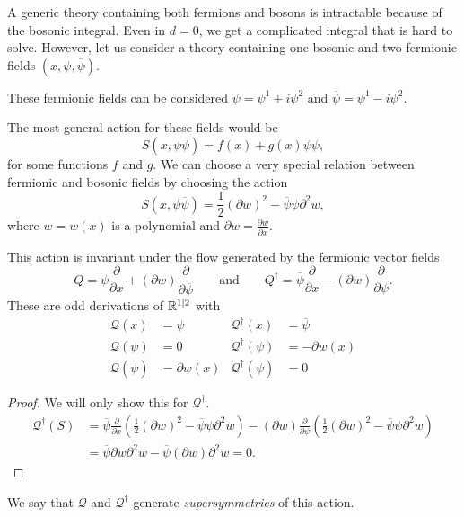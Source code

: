 A generic theory containing both fermions and bosons is intractable because of the bosonic integral. Even in $d = 0$, we get a complicated integral that is hard to solve.
However, let us consider a theory containing one bosonic and two fermionic fields $(x, \psi, \overline{\psi})$.
\begin{leftbar}
  These fermionic fields can be considered $\psi = \psi^1 + i \psi^2$ and $\overline{\psi} = \psi^1 - i \psi^2$.
\end{leftbar}
The most general action for these fields would be
\begin{equation}
  S(x, \psi \overline{\psi}) = f(x) + g(x) \overline{\psi} \psi,
\end{equation}
for some functions $f$ and $g$.
We can choose a very special relation between fermionic and bosonic fields by choosing the action
\begin{equation}
  S(x, \psi \overline{\psi}) = \frac{1}{2}(\partial w)^2 - \overline{\psi} \psi \partial^2 w,
\end{equation}
where $w = w(x)$ is a polynomial and $\partial w = \frac{\partial w}{\partial x}$.
\begin{claim}
  This action is invariant under the flow generated by the fermionic vector fields
  \begin{equation}
    Q = \psi \frac{\partial }{\partial x} + (\partial w) \frac{\partial }{\partial \overline{\psi}} \qquad \text{and} \qquad Q^{\dagger} = \overline{\psi} \frac{\partial }{\partial x} - (\partial w) \frac{\partial }{\partial \psi}.
  \end{equation}
  These are odd derivations of $\mathbb{R}^{1 \suchthat 2}$ with 
  \begin{align}
    \mathcal{Q}(x) &= \psi & \mathcal{Q}^{\dagger}(x) &= \overline{\psi} \\
    \mathcal{Q}(\psi) &= 0 &  \mathcal{Q}^{\dagger}(\psi) &= -\partial w (x) \\
    \mathcal{Q}(\overline{\psi}) &= \partial w (x) & \mathcal{Q}^{\dagger}(\overline{\psi}) &= 0
  \end{align}
\end{claim}
\begin{proof}
  We will only show this for $\mathcal{Q}^{\dagger}$.
  \begin{align}
    \mathcal{Q}^{\dagger}(S) &= \overline{\psi} \frac{\partial }{\partial x} \left( \frac{1}{2} (\partial w)^2 - \overline{\psi} \psi \partial^2 w \right) - (\partial w) \frac{\partial }{\partial \psi} \left( \frac{1}{2} (\partial w)^2 - \overline{\psi} \psi \partial^2 w \right) \\
			     &= \overline{\psi} \partial w \partial^2 w - \overline{\psi} (\partial w) \partial^2 w = 0.
  \end{align}
\end{proof}
We say that $\mathcal{Q}$ and $\mathcal{Q}^{\dagger}$ generate \emph{supersymmetries} of this action.

